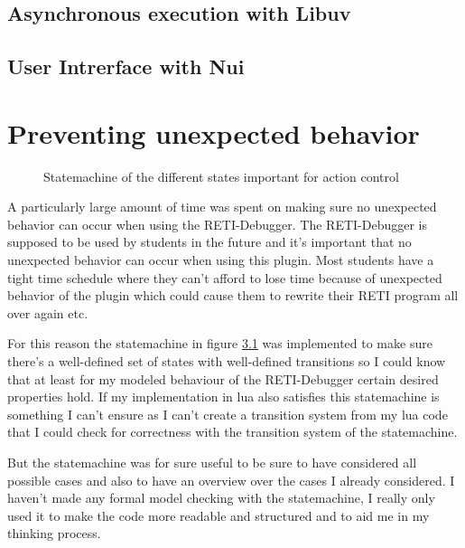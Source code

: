 \documentclass{report}
\begin{document}
\section{Asynchronous execution with Libuv}
\label{sec:asynchronous execution with libuv}


\section{User Intrerface with Nui}

\newpage
\chapter{Preventing unexpected behavior}

\begin{figure}
	\centering
	\caption{Statemachine of the different states important for action control}
	\label{fig:statemachine}
\end{figure}

A particularly large amount of time was spent on making sure no unexpected behavior can occur when using the RETI-Debugger. The RETI-Debugger is supposed to be used by students in the future and it's important that no unexpected behavior can occur when using this plugin. Most students have a tight time schedule where they can't afford to lose time because of unexpected behavior of the plugin which could cause them to rewrite their RETI program all over again etc. 

For this reason the \alert{statemachine} in figure \ref{fig:statemachine} was implemented to make sure there's a well-defined set of states with well-defined transitions so I could know that at least for my modeled behaviour of the RETI-Debugger certain desired properties hold. If my implementation in lua also satisfies this statemachine is something I can't ensure as I can't create a \alert{transition system} from my lua code that I could check for correctness with the transition system of the statemachine. 

But the statemachine was for sure useful to be sure to have considered all possible cases and also to have an overview over the cases I already considered. I haven't made any formal model checking with the statemachine, I really only used it to make the code more readable and structured and to aid me in my thinking process.
\end{document}
